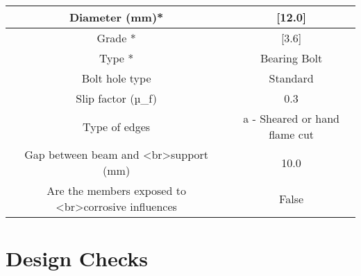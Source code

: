 \documentclass{article}%
\begin{document}
\begin{longtable}{|p{5cm}|p{2cm}|p{2cm}|p{2cm}|p{5cm}|}
\hline%
\hline%
\multicolumn{3}{|c|}{Diameter (mm)*}&\multicolumn{2}{|c|}{{[}12.0{]}}\\%
\hline%
\hline%
\multicolumn{3}{|c|}{Grade *}&\multicolumn{2}{|c|}{{[}3.6{]}}\\%
\hline%
\hline%
\multicolumn{3}{|c|}{Type *}&\multicolumn{2}{|c|}{Bearing Bolt}\\%
\hline%
\hline%
\multicolumn{3}{|c|}{Bolt hole type}&\multicolumn{2}{|c|}{Standard}\\%
\hline%
\hline%
\multicolumn{3}{|c|}{Slip factor (µ\_f)}&\multicolumn{2}{|c|}{0.3}\\%
\hline%
\hline%
\multicolumn{3}{|c|}{Type of edges}&\multicolumn{2}{|c|}{a {-} Sheared or hand flame cut}\\%
\hline%
\hline%
\multicolumn{3}{|c|}{Gap between beam and <br>support (mm)}&\multicolumn{2}{|c|}{10.0}\\%
\hline%
\hline%
\multicolumn{3}{|c|}{Are the members exposed to <br>corrosive influences}&\multicolumn{2}{|c|}{False}\\%
\hline%
\end{longtable}

%
%
\newpage%
\section{Design Checks}%
\label{sec:DesignChecks}%
\end{document}
